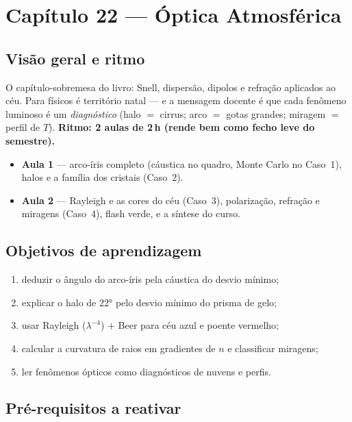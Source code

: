 \section{Capítulo 22 --- Óptica Atmosférica}

\subsection*{Visão geral e ritmo}

O capítulo-sobremesa do livro: Snell, dispersão, dipolos e refração
aplicados ao céu. Para físicos é território natal — e a mensagem
docente é que cada fenômeno luminoso é um \emph{diagnóstico} (halo $=$
cirrus; arco $=$ gotas grandes; miragem $=$ perfil de $T$).
\textbf{Ritmo: 2 aulas de 2\,h (rende bem como fecho leve do
semestre).}

\begin{itemize}
  \item \textbf{Aula 1} — arco-íris completo (cáustica no quadro,
        Monte Carlo no Caso~1), halos e a família dos cristais
        (Caso~2).
  \item \textbf{Aula 2} — Rayleigh e as cores do céu (Caso~3),
        polarização, refração e miragens (Caso~4), flash verde, e a
        síntese do curso.
\end{itemize}

\subsection*{Objetivos de aprendizagem}

\begin{enumerate}
  \item deduzir o ângulo do arco-íris pela cáustica do desvio mínimo;
  \item explicar o halo de 22° pelo desvio mínimo do prisma de gelo;
  \item usar Rayleigh ($\lambda^{-4}$) $+$ Beer para céu azul e poente
        vermelho;
  \item calcular a curvatura de raios em gradientes de $n$ e
        classificar miragens;
  \item ler fenômenos ópticos como diagnósticos de nuvens e perfis.
\end{enumerate}

\subsection*{Pré-requisitos a reativar}

